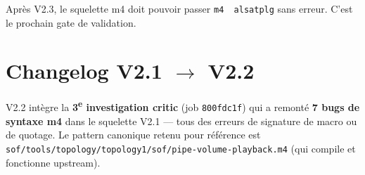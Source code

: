 \documentclass[11pt,a4paper]{article}
\begin{document}
Après V2.3, le squelette m4 doit pouvoir passer \texttt{m4 \textbar\ alsatplg} sans erreur. C'est le prochain gate de validation.

\clearpage

\section*{Changelog V2.1 $\rightarrow$ V2.2}

V2.2 intègre la \textbf{3\textsuperscript{e} investigation critic} (job \texttt{800fdc1f}) qui a remonté \textbf{7 bugs de syntaxe m4} dans le squelette V2.1 --- tous des erreurs de signature de macro ou de quotage. Le pattern canonique retenu pour référence est \texttt{sof/tools/topology/topology1/sof/pipe-volume-playback.m4} (qui compile et fonctionne upstream).
\end{document}
